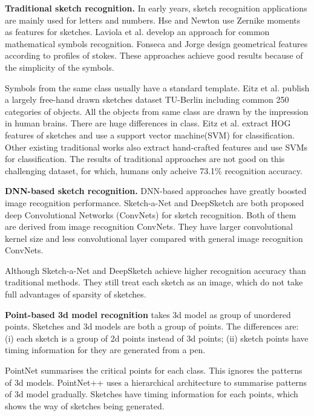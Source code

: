 \textbf{Traditional sketch recognition.} In early years, sketch recognition applications \cite{Hse2004SketchedSR, LaViola2004MathPad2AS, Fonseca2000UsingFL} are mainly used for letters and numbers. Hse and Newton \cite{Hse2004SketchedSR} use Zernike moments as features for sketches. Laviola et al. \cite{LaViola2004MathPad2AS} develop an approach for common mathematical symbols recognition. Fonseca and Jorge \cite{Fonseca2000UsingFL} design geometrical features  according to profiles of stokes. These approaches achieve good results because of the simplicity of the symbols.

Symbols from the same class usually have a standard template. Eitz et al. \cite{Eitz2012HowDH} publish a largely free-hand drawn sketches dataset TU-Berlin including common 250 categories of objects. All the objects from same class are drawn by the impression in human brains. There are huge differences in class. Eitz et al. extract HOG features of sketches and use a support vector machine(SVM) for classification. Other existing traditional works \cite{LiHSG15, Schneider2014SketchCA} also extract hand-crafted features and use SVMs for classification. The results of traditional approaches are not good on this challenging dataset, for which, humans only acheive 73.1\% recognition accuracy.

\textbf{DNN-based sketch recognition.} DNN-based approaches have greatly boosted image recognition performance. Sketch-a-Net \cite{Yu2015SketchaNetTB} and DeepSketch \cite{Seddati2015DeepSketchDC} are both proposed deep Convolutional Networks (ConvNets) for sketch recognition. Both of them are derived from image recognition ConvNets. They have larger convolutional kernel size and less convolutional layer compared with general image recognition ConvNets.

Although Sketch-a-Net \cite{Yu2015SketchaNetTB} and DeepSketch \cite{Seddati2015DeepSketchDC} achieve higher recognition accuracy than traditional methods. They still treat each sketch as an image, which do not take full advantages of sparsity of sketches.

\textbf{Point-based 3d model recognition} takes 3d model as group of unordered points. Sketches and 3d models are both a group of points. The differences are: (i) each sketch is a group of 2d points instead of 3d points; (ii) sketch points have timing information for they are generated from a pen.

PointNet \cite{qi2017pointnet} summarises the critical points for each class. This ignores the patterns of 3d models. PointNet++ \cite{qi2017pointnetplusplus} uses a hierarchical architecture to summarise patterns of 3d model gradually. Sketches have timing information for each points, which shows the way of sketches being generated.

